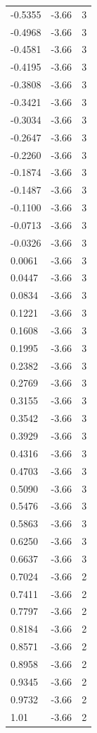 \begin{longtable}{lrr}
  -0.5355 & -3.66 & 3 \\
  -0.4968 & -3.66 & 3 \\
  -0.4581 & -3.66 & 3 \\
  -0.4195 & -3.66 & 3 \\
  -0.3808 & -3.66 & 3 \\
  -0.3421 & -3.66 & 3 \\
  -0.3034 & -3.66 & 3 \\
  -0.2647 & -3.66 & 3 \\
  -0.2260 & -3.66 & 3 \\
  -0.1874 & -3.66 & 3 \\
  -0.1487 & -3.66 & 3 \\
  -0.1100 & -3.66 & 3 \\
  -0.0713 & -3.66 & 3 \\
  -0.0326 & -3.66 & 3 \\
  0.0061 & -3.66 & 3 \\
  0.0447 & -3.66 & 3 \\
  0.0834 & -3.66 & 3 \\
  0.1221 & -3.66 & 3 \\
  0.1608 & -3.66 & 3 \\
  0.1995 & -3.66 & 3 \\
  0.2382 & -3.66 & 3 \\
  0.2769 & -3.66 & 3 \\
  0.3155 & -3.66 & 3 \\
  0.3542 & -3.66 & 3 \\
  0.3929 & -3.66 & 3 \\
  0.4316 & -3.66 & 3 \\
  0.4703 & -3.66 & 3 \\
  0.5090 & -3.66 & 3 \\
  0.5476 & -3.66 & 3 \\
  0.5863 & -3.66 & 3 \\
  0.6250 & -3.66 & 3 \\
  0.6637 & -3.66 & 3 \\
  0.7024 & -3.66 & 2 \\
  0.7411 & -3.66 & 2 \\
  0.7797 & -3.66 & 2 \\
  0.8184 & -3.66 & 2 \\
  0.8571 & -3.66 & 2 \\
  0.8958 & -3.66 & 2 \\
  0.9345 & -3.66 & 2 \\
  0.9732 & -3.66 & 2 \\
  1.01 & -3.66 & 2 \\

\end{longtable}
